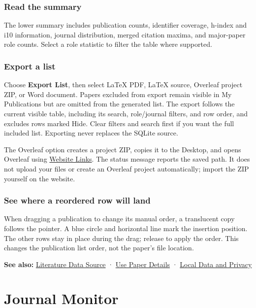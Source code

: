 \documentclass[10pt,letterpaper,oneside]{scrreprt}
\newenvironment{GewuRelated}{\par\nobreak\vspace{3pt}\nobreak\begingroup\small\sffamily\begin{samepage}\noindent}{\par\end{samepage}\endgroup}
\begin{document}
\subsection{Read the summary}\label{read-the-summary}

The lower summary includes publication counts, identifier coverage, h-index and i10 information, journal distribution, merged citation maxima, and major-paper role counts. Select a role statistic to filter the table where supported.

\subsection{Export a list}\label{export-a-list}

Choose \textbf{Export List}, then select LaTeX PDF, LaTeX source, Overleaf project ZIP, or Word document. Papers excluded from export remain visible in My Publications but are omitted from the generated list. The export follows the current visible table, including its search, role/journal filters, and row order, and excludes rows marked Hide. Clear filters and search first if you want the full included list. Exporting never replaces the SQLite source.

The Overleaf option creates a project ZIP, copies it to the Desktop, and opens Overleaf using \hyperref[website-link-settings]{Website Links}. The status message reports the saved path. It does not upload your files or create an Overleaf project automatically; import the ZIP yourself on the website.

\subsection{See where a reordered row will land}\label{see-where-a-reordered-row-will-land}

When dragging a publication to change its manual order, a translucent copy follows the pointer. A blue circle and horizontal line mark the insertion position. The other rows stay in place during the drag; release to apply the order. This changes the publication list order, not the paper's file location.

\begin{GewuRelated}
\textbf{See also:} \hyperref[citation-settings]{Literature Data Source} · \hyperref[paper-details]{Use Paper Details} · \hyperref[privacy]{Local Data and Privacy}
\end{GewuRelated}

\chapter{Journal Monitor}\label{chapter-15}
\end{document}
